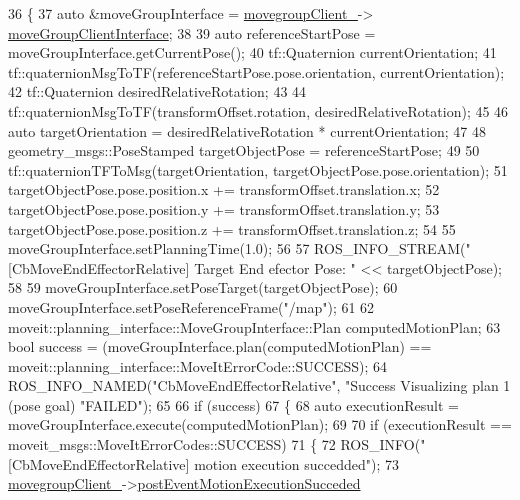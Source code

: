 \begin{DoxyCode}
36 \{
37     \textcolor{keyword}{auto} &moveGroupInterface = \hyperlink{classsm__moveit_1_1cl__movegroup_1_1CbMoveEndEffectorRelative_ac0592d5931ff7d0bb22446b651bbf615}{movegroupClient\_}->
      \hyperlink{classsm__moveit_1_1cl__movegroup_1_1ClMoveGroup_a23acf6883455566dbab30e4367c2144d}{moveGroupClientInterface};
38 
39     \textcolor{keyword}{auto} referenceStartPose = moveGroupInterface.getCurrentPose();
40     tf::Quaternion currentOrientation;
41     tf::quaternionMsgToTF(referenceStartPose.pose.orientation, currentOrientation);
42     tf::Quaternion desiredRelativeRotation;
43 
44     tf::quaternionMsgToTF(transformOffset.rotation, desiredRelativeRotation);
45 
46     \textcolor{keyword}{auto} targetOrientation = desiredRelativeRotation * currentOrientation;
47 
48     geometry\_msgs::PoseStamped targetObjectPose = referenceStartPose;
49 
50     tf::quaternionTFToMsg(targetOrientation, targetObjectPose.pose.orientation);
51     targetObjectPose.pose.position.x += transformOffset.translation.x;
52     targetObjectPose.pose.position.y += transformOffset.translation.y;
53     targetObjectPose.pose.position.z += transformOffset.translation.z;
54 
55     moveGroupInterface.setPlanningTime(1.0);
56 
57     ROS\_INFO\_STREAM(\textcolor{stringliteral}{"[CbMoveEndEffectorRelative] Target End efector Pose: "} << targetObjectPose);
58 
59     moveGroupInterface.setPoseTarget(targetObjectPose);
60     moveGroupInterface.setPoseReferenceFrame(\textcolor{stringliteral}{"/map"});
61 
62     moveit::planning\_interface::MoveGroupInterface::Plan computedMotionPlan;
63     \textcolor{keywordtype}{bool} success = (moveGroupInterface.plan(computedMotionPlan) == 
      moveit::planning\_interface::MoveItErrorCode::SUCCESS);
64     ROS\_INFO\_NAMED(\textcolor{stringliteral}{"CbMoveEndEffectorRelative"}, \textcolor{stringliteral}{"Success Visualizing plan 1 (pose goal) %
       \textcolor{stringliteral}{"FAILED"});
65 
66     \textcolor{keywordflow}{if} (success)
67     \{
68         \textcolor{keyword}{auto} executionResult = moveGroupInterface.execute(computedMotionPlan);
69 
70         \textcolor{keywordflow}{if} (executionResult == moveit\_msgs::MoveItErrorCodes::SUCCESS)
71         \{
72             ROS\_INFO(\textcolor{stringliteral}{"[CbMoveEndEffectorRelative] motion execution succedded"});
73             \hyperlink{classsm__moveit_1_1cl__movegroup_1_1CbMoveEndEffectorRelative_ac0592d5931ff7d0bb22446b651bbf615}{movegroupClient\_}->\hyperlink{classsm__moveit_1_1cl__movegroup_1_1ClMoveGroup_ab4585dcd850286ed168a25a3ddd56eed}{postEventMotionExecutionSucceded}
}
\end{DoxyCode}
